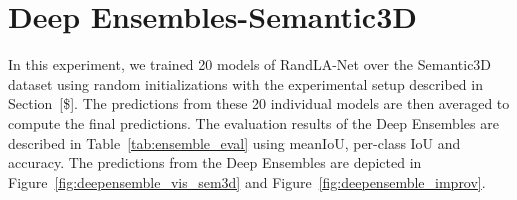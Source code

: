     \section{Deep Ensembles-Semantic3D}
    \label{sec:deepensemble_train}
    In this experiment, we trained 20 models of RandLA-Net over the Semantic3D dataset using random initializations with the experimental setup described in Section~[\$].
    The predictions from these 20 individual models are then averaged to compute the final predictions.
    The evaluation results of the Deep Ensembles are described in Table~\ref{tab:ensemble_eval} using meanIoU, per-class IoU and accuracy.
    The predictions from the Deep Ensembles are depicted in Figure~\ref{fig:deepensemble_vis_sem3d} and Figure~\ref{fig:deepensemble_improv}.
    \begin{table}[h!]
        \caption{Illustration of performance of RandLA-Net on Semantic3D over ensemble size. meanIOU, IOU per-class and overall accuracy are represented here.
        C1 to C8 are the classes of Semantic3D which are Manmadeterrain, Naturalterrain, Highvegetation, Lowvegetation, Buildings, Hardscapes, Scanningartifacts, and Cars.}
        \label{tab:ensemble_eval}
    \end{table} 

